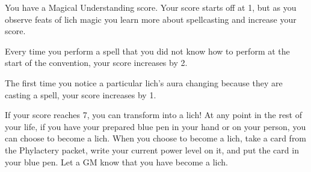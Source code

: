 \documentclass[green]{Sel}
\begin{document}
\name{\gCarminisMagicalUnderstanding{}}

You have a Magical Understanding score. Your score starts off at 1, but as you observe feats of lich magic you learn more about spellcasting and increase your score.

Every time you perform a spell that you did not know how to perform at the start of the convention, your score increases by 2.

The first time you notice a particular lich's aura changing because they are casting a spell, your score increases by 1.

If your score reaches 7, you can transform into a lich! At any point in the rest of your life, if you have your prepared blue pen in your hand or on your person, you can choose to become a lich. When you choose to become a lich, take a card from the Phylactery packet, write your current power level on it, and put the card in your blue pen. Let a GM know that you have become a lich.
\end{document}
